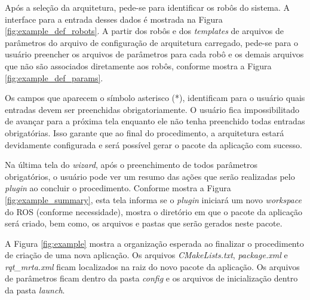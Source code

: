             Após a seleção da arquitetura, pede-se para identificar os robôs do sistema. A interface para a entrada desses dados é mostrada na Figura \ref{fig:example_def_robots}. A partir dos robôs e dos \textit{templates} de arquivos de parâmetros do arquivo de configuração de arquitetura carregado, pede-se para o usuário preencher os arquivos de parâmetros para cada robô e os demais arquivos que não são associados diretamente aos robôs, conforme mostra a Figura \ref{fig:example_def_params}.
            
            Os campos que aparecem o símbolo asterisco (*), identificam para o usuário quais entradas devem ser preenchidas obrigatoriamente. O usuário fica impossibilitado de avançar para a próxima tela enquanto ele não tenha preenchido todas entradas obrigatórias. Isso garante que ao final do procedimento, a arquitetura estará devidamente configurada e será possível gerar o pacote da aplicação com sucesso.
            
            Na última tela do \textit{wizard}, após o preenchimento de todos parâmetros obrigatórios, o usuário pode ver um resumo das ações que serão realizadas pelo \textit{plugin} ao concluir o procedimento. Conforme mostra a Figura \ref{fig:example_summary}, esta tela informa se o \textit{plugin} iniciará um novo \textit{workspace} do ROS (conforme necessidade), mostra o diretório em que o pacote da aplicação será criado, bem como, os arquivos e pastas que serão gerados neste pacote.
            
            A Figura \ref{fig:example} mostra a organização esperada ao finalizar o procedimento de criação de uma nova aplicação. Os arquivos \textit{CMakeLists.txt}, \textit{package.xml} e \textit{rqt\_mrta.xml} ficam localizados na raiz do novo pacote da aplicação. Os arquivos de parâmetros ficam dentro da pasta \textit{config} e os arquivos de inicialização dentro da pasta \textit{launch}.
            

